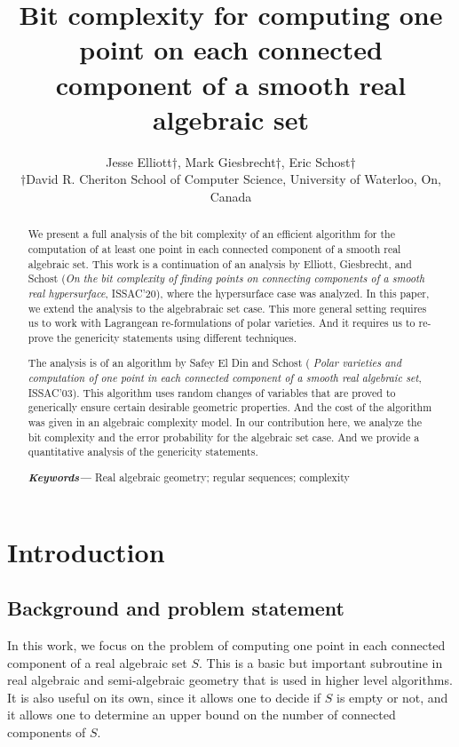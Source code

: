 \documentclass[a4paper]{article}
\title{Bit complexity for computing one point on each connected component of a smooth real algebraic set}
\author{Jesse Elliott$\dagger$, Mark Giesbrecht$\dagger$, Eric Schost$\dagger$  \\
        \small $\dagger$David R. Cheriton School of Computer Science, University of Waterloo, On, Canada \\
}
\date{} %
\providecommand{\keywords}[1]
{
  \small	
  \textbf{\textit{Keywords---}} #1
}
\begin{document}
%
\maketitle
%
\tableofcontents
\newpage
%
%
%
\begin{abstract}
We present a full analysis of the bit complexity of an efficient
  algorithm for the computation of at least one point in each
  connected component of a smooth real algebraic set. This work is a continuation of an analysis by Elliott, Giesbrecht, and Schost ({\em On the bit complexity of finding points on connecting components of a smooth real hypersurface}, ISSAC'20), where the hypersurface case was analyzed. In this paper, we extend the analysis to the algebrabraic set case. This more general setting requires us to work with Lagrangean re-formulations of polar varieties. And it requires us to re-prove the genericity statements using different techniques.  
    
    The analysis is of an algorithm by Safey El Din and Schost ({\em
    Polar varieties and computation of one point in each connected
    component of a smooth real algebraic set}, ISSAC'03). This
  algorithm uses random changes of variables that are proved to
  generically ensure certain desirable geometric properties. And the
  cost of the algorithm was given in an algebraic complexity
  model. In our contribution here, we analyze the bit complexity and the error probability for the algebraic set case. And we provide a
  quantitative analysis of the genericity statements. 

\keywords{Real algebraic geometry; regular sequences; complexity}
\end{abstract}
%
%
%




\section{Introduction}
\label{sec:overview}

%
\subsection{Background and problem statement}
%
In this work, we focus on the problem of computing one point in each connected component of a real algebraic
set $S$. This is a basic but important subroutine in real algebraic and semi-algebraic
geometry that is used in higher level algorithms. It is also useful on its own, since it allows one to
decide if $S$ is empty or not, and it allows one to determine an upper bound on the number of connected components of $S$.  
\end{document}
